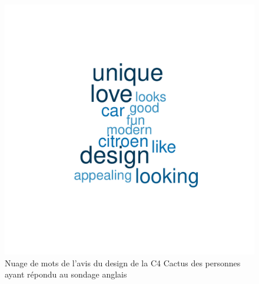 \documentclass[12pt]{article}\usepackage[]{graphicx}\usepackage[]{color}
\makeatletter
\def\maxwidth{ %
  \ifdim\Gin@nat@width>\linewidth
    \linewidth
  \else
    \Gin@nat@width
  \fi
}
\newenvironment{knitrout}{}{} %
\makeatother
\begin{document}
\begin{knitrout}
\color{fgcolor}\begin{figure}[H]
\includegraphics[width=\maxwidth]{figure/design_en-1} \caption[Nuage de mots de l'avis du design de la C4 Cactus des personnes ayant répondu au sondage anglais]{Nuage de mots de l'avis du design de la C4 Cactus des personnes ayant répondu au sondage anglais}\label{fig:design en}
\end{figure}


\end{knitrout}
\end{document}
